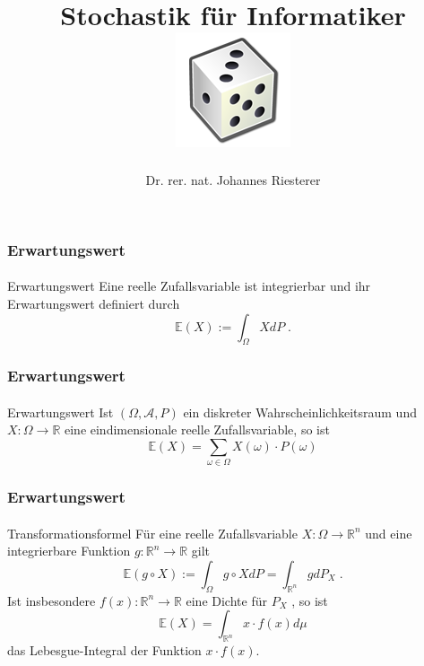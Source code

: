 \documentclass{beamer}
\begin{document}
\title[Stochastik] %
{Stochastik für Informatiker
\\
\includegraphics[scale=0.5]{img/craps}
}
\subtitle{}
\author[Dr. Johannes Riesterer] %
{Dr.  rer. nat. Johannes Riesterer}

\date[KPT 2004] %
{}

\subject{Stochastik}


\frame{\titlepage}





\begin{frame}
    \frametitle{Erwartungswert}
\framesubtitle{}
\begin{block}{Erwartungswert}
Eine reelle Zufallsvariable ist integrierbar und ihr Erwartungswert definiert durch
$$ \mathbb{E} (X) := \int_{\Omega} X dP \; .$$
\end{block}
 \end{frame}


\begin{frame}
    \frametitle{Erwartungswert}
\framesubtitle{}
\begin{block}{Erwartungswert}
Ist $(\Omega, \mathcal{A}, P)$ ein diskreter Wahrscheinlichkeitsraum und $X :\Omega \to \mathbb{R}$ eine eindimensionale reelle Zufallsvariable, so ist
$$ \mathbb{E} (X) = \sum_{\omega \in \Omega}  X(\omega) \cdot P(\omega)$$
\end{block}
 \end{frame}


\begin{frame}
    \frametitle{Erwartungswert}
\framesubtitle{}
\begin{block}{Transformationsformel}
Für eine reelle Zufallsvariable $X: \Omega \to \mathbb{R}^n$ und eine integrierbare Funktion $g:  \mathbb{R}^n \to \mathbb{R}$ gilt
$$ \mathbb{E} (g \circ X) := \int_{\Omega} g \circ X dP = \int_{\mathbb{R}^n}  g  dP_X \;. $$
Ist insbesondere $f(x) : \mathbb{R}^n \to \mathbb{R}$ eine Dichte für $P_X$ , so ist  
$$\mathbb{E} (X) =  \int_{\mathbb{R}^n} x \cdot f(x) d\mu$$ das Lebesgue-Integral der Funktion $x \cdot f(x)$.
\end{block}
 \end{frame}
\end{document}
